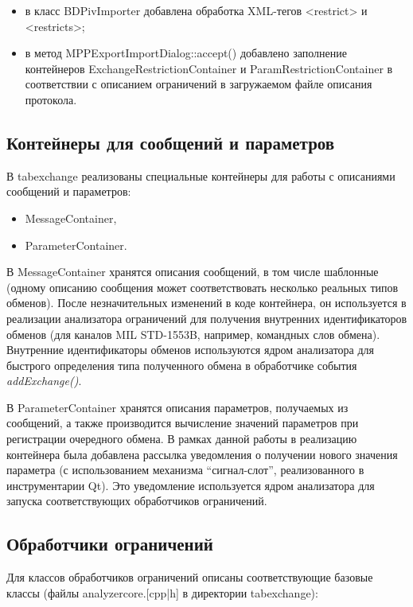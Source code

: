 \begin{itemize}
\item в класс BDPivImporter добавлена обработка XML-тегов <restrict> и 
<restricts>;
\item в метод MPPExportImportDialog::accept() добавлено заполнение контейнеров 
ExchangeRestrictionContainer и ParamRestrictionContainer в соответствии с 
описанием ограничений в загружаемом файле описания протокола.
\end{itemize}

\subsection{Контейнеры для сообщений и параметров}

В tabexchange реализованы специальные контейнеры для работы с описаниями 
сообщений и параметров:

\begin{itemize}
 \item MessageContainer,
 \item ParameterContainer.
\end{itemize}

В MessageContainer хранятся описания сообщений, в том числе шаблонные (одному 
описанию сообщения может соответствовать несколько реальных типов обменов). 
После незначительных изменений в коде контейнера, он используется в реализации 
анализатора ограничений для получения внутренних идентификаторов обменов (для 
каналов MIL STD-1553B, например, командных слов обмена). Внутренние 
идентификаторы обменов используются ядром анализатора для быстрого определения 
типа полученного обмена в обработчике события \textit{addExchange()}.

В ParameterContainer хранятся описания параметров, получаемых из сообщений, а 
также производится вычисление значений параметров при регистрации очередного 
обмена. В рамках данной работы в реализацию контейнера была добавлена рассылка 
уведомления о получении нового значения параметра (с использованием механизма 
``сигнал-слот'', реализованного в инструментарии Qt). Это уведомление 
используется ядром анализатора для запуска соответствующих обработчиков 
ограничений.

\subsection{Обработчики ограничений}

Для классов обработчиков ограничений описаны соответствующие базовые классы 
(файлы analyzercore.[cpp|h] в директории tabexchange):

